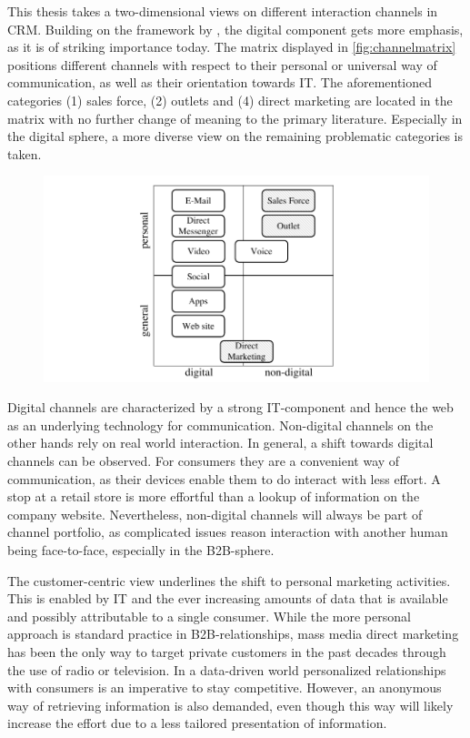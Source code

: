 		This thesis takes a two-dimensional views on different interaction channels in CRM. Building on the framework by \citeauthor{paynefrow2005}, the digital component gets more emphasis, as it is of striking importance today. The matrix displayed in \ref{fig:channelmatrix} positions different channels with respect to their personal or universal way of communication, as well as their orientation towards IT. The aforementioned categories (1) sales force, (2) outlets and (4) direct marketing are located in the matrix with no further change of meaning to the primary literature. Especially in the digital sphere, a more diverse view on the remaining problematic categories is taken.
		
			\begin{figure}[caption={Channel matrix}, label={fig:channelmatrix}]
			{	\includegraphics[width=.8\textwidth]{figures/channelmatrix.pdf}}
		\end{figure}
		

		Digital channels are characterized by a strong IT-component and hence the web as an underlying technology for communication. Non-digital channels on the other hands rely on real world interaction. In general, a shift towards digital channels can be observed. For consumers they are a convenient way of communication, as their devices enable them to do interact with less effort. A stop at a retail store is more effortful than a lookup of information on the company website. Nevertheless, non-digital channels will always be part of channel portfolio, as complicated issues reason interaction with another human being face-to-face, especially in the B2B-sphere. 
		
		The customer-centric view underlines the shift to personal marketing activities. This is enabled by IT and the ever increasing amounts of data that is available and possibly attributable to a single consumer. While the more personal approach is standard practice in B2B-relationships, mass media direct marketing has been the only way to target private customers in the past decades through the use of radio or television. In a data-driven world personalized relationships with consumers is an imperative to stay competitive. However, an anonymous way of retrieving information is also demanded, even though this way will likely increase the effort due to a less tailored presentation of information. 
		
